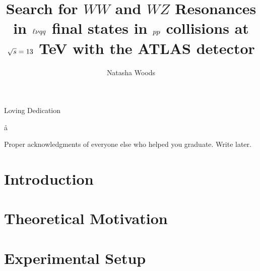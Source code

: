 





\title{Search for $WW$ and $WZ$ Resonances in $\ell\nu \MakeLowercase{qq}$ final states in $\MakeLowercase{pp}$ collisions at $\sqrt{\MakeLowercase{s}}=13$ TeV with the ATLAS detector}
\author{Natasha Woods}
\deanlinethree{}

\begin{frontmatter}
\maketitle

\copyrightpage

\tableofcontents


\listoffigures

\listoftables
\begin{abstract}

\end{abstract}

\begin{dedication}
\vspace*{\fill}
\begin{center}
Loving Dedication
\end{center}
\vspace*{\fill}å
\end{dedication}

\begin{acknowledgements}
Proper acknowledgments of everyone else who helped you graduate. Write later.
\end{acknowledgements}

\end{frontmatter}
\linenumbers
\part{Introduction}


\part{Theoretical Motivation}


\part {Experimental Setup}

%

